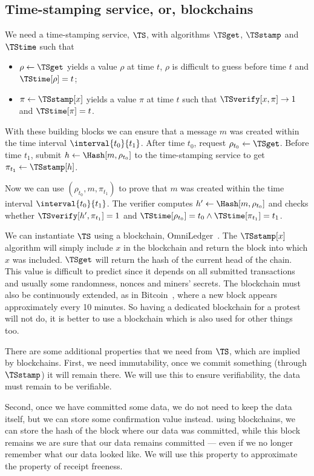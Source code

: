 \subsection{Time-stamping service, or, blockchains}%
\label{StorageProperties}


We need a time-stamping service, \(\TS\), with algorithms \(\TSget\), 
\(\TSstamp\) and \(\TStime\) such that
\begin{itemize}
  \item \(\rho \gets \TSget\) yields a value \(\rho\) at time \(t\), \(\rho\) is 
    difficult to guess before time \(t\) and \(\TStime[\rho] = t\);
  \item \(\pi\gets \TSstamp[x]\) yields a value \(\pi\) at time \(t\) such that 
    \(\TSverify[x, \pi]\to 1\) and \(\TStime[\pi] = t\).
\end{itemize}

With these building blocks we can ensure that a message \(m\) was created within 
the time interval \(\interval{t_0}{t_1}\).
After time \(t_0\), request \(\rho_{t_0}\gets \TSget\).
Before time \(t_1\), submit \(h\gets \Hash[m, \rho_{t_0}]\) to the time-stamping 
service to get \(\pi_{t_1}\gets \TSstamp[h]\).

Now we can use \((\rho_{t_0}, m, \pi_{t_1})\) to prove that \(m\) was created 
within the time interval \(\interval{t_0}{t_1}\).
The verifier computes \(h'\gets \Hash[m, \rho_{t_0}]\) and checks whether 
\(\TSverify[h', \pi_{t_1}] = 1\) and \(\TStime[\rho_{t_0}] = t_0\land 
  \TStime[\pi_{t_1}] = t_1\).

We can instantiate \(\TS\) using a blockchain, \eg OmniLedger~\cite{OmniLedger}.
The \(\TSstamp[x]\) algorithm will simply include \(x\) in the blockchain and 
return the block into which \(x\) was included.
\(\TSget\) will return the hash of the current head of the chain.
This value is difficult to predict since it depends on all submitted 
transactions and usually some randomness, \eg nonces and miners' secrets.
The blockchain must also be continuously extended, \eg as in
Bitcoin~\cite{Bitcoin}, where a new block appears approximately every 10 
minutes.
So having a dedicated blockchain for a protest will not do, it is better to use 
a blockchain which is also used for other things too.

There are some additional properties that we need from \(\TS\), which are 
implied by blockchains.
First, we need immutability, \ie once we commit something (through \(\TSstamp\)) 
it will remain there.
We will use this to ensure verifiability, the data must remain to be verifiable.

Second, once we have committed some data, we do not need to keep the data 
itself, but we can store some confirmation value instead.
\Eg using blockchains, we can store the hash of the block where our data was 
committed, while this block remains we are sure that our data remains committed 
--- even if we no longer remember what our data looked like.
We will use this property to approximate the property of receipt freeness.
